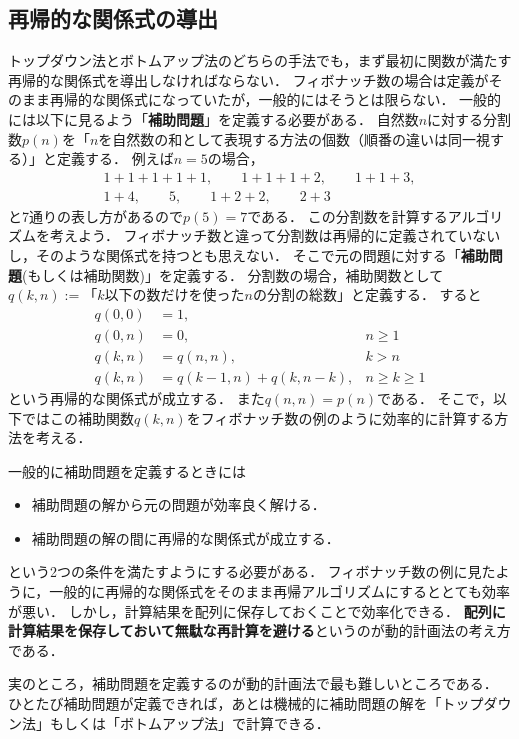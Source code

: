 \documentclass[a4paper,twoside,onecolumn,openany,article]{memoir}
\theoremstyle{remark}
\begin{document}
\subsection{再帰的な関係式の導出}
トップダウン法とボトムアップ法のどちらの手法でも，まず最初に関数が満たす再帰的な関係式を導出しなければならない．
フィボナッチ数の場合は定義がそのまま再帰的な関係式になっていたが，一般的にはそうとは限らない．
一般的には以下に見るよう「\textbf{補助問題}」を定義する必要がある．
自然数$n$に対する分割数$p(n)$を「$n$を自然数の和として表現する方法の個数（順番の違いは同一視する）」と定義する．
例えば$n=5$の場合，
\begin{align*}
1+1+1+1+1,\qquad 1+1+1+2,\qquad 1+1+3,\\
1+4,\qquad 5,\qquad 1+2+2,\qquad 2+3
\end{align*}
と7通りの表し方があるので$p(5)=7$である．
この分割数を計算するアルゴリズムを考えよう．
フィボナッチ数と違って分割数は再帰的に定義されていないし，そのような関係式を持つとも思えない．
そこで元の問題に対する「\textbf{補助問題}(もしくは補助関数)」を定義する．
分割数の場合，補助関数として$q(k,n):=\text{「$k$以下の数だけを使った$n$の分割の総数」}$と定義する．
すると
\begin{align*}
q(0,0) &= 1,\\
q(0,n) &= 0,& n \ge 1\\
q(k,n) &= q(n,n),& k > n\\
q(k,n) &= q(k-1,n) + q(k, n-k),& n\ge k\ge 1
\end{align*}
という再帰的な関係式が成立する．
また$q(n,n)=p(n)$である．
そこで，以下ではこの補助関数$q(k,n)$をフィボナッチ数の例のように効率的に計算する方法を考える．

一般的に補助問題を定義するときには
\begin{itemize}
\item 補助問題の解から元の問題が効率良く解ける．
\item 補助問題の解の間に再帰的な関係式が成立する．
\end{itemize}
という2つの条件を満たすようにする必要がある．
フィボナッチ数の例に見たように，一般的に再帰的な関係式をそのまま再帰アルゴリズムにするととても効率が悪い．
しかし，計算結果を配列に保存しておくことで効率化できる．
\textbf{配列に計算結果を保存しておいて無駄な再計算を避ける}というのが動的計画法の考え方である．


実のところ，補助問題を定義するのが動的計画法で最も難しいところである．
ひとたび補助問題が定義できれば，あとは機械的に補助問題の解を「トップダウン法」もしくは「ボトムアップ法」で計算できる．
\end{document}

